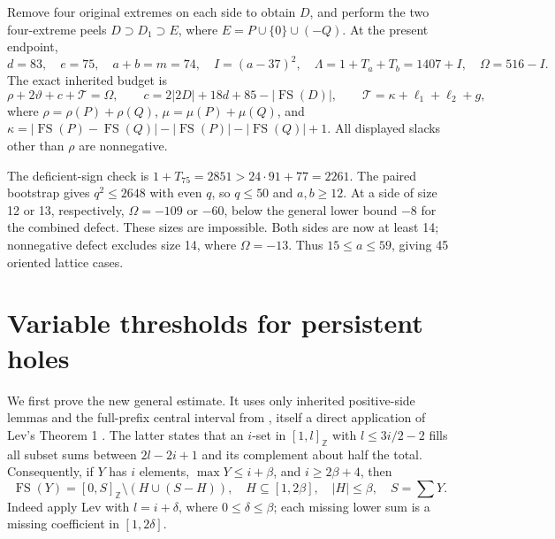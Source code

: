 \documentclass[11pt,a4paper]{article}
\newcommand{\FS}{\operatorname{FS}}
\newcommand{\Z}{\mathbb Z}
\newcommand{\T}{\mathcal T}
\begin{document}
Remove four original extremes on each side to obtain $D$, and perform
the two four-extreme peels $D\supset D_1\supset E$, where
$E=P\cup\{0\}\cup(-Q)$. At the present endpoint,
\[
 d=83,\quad e=75,\quad a+b=m=74,\quad I=(a-37)^2,
 \quad\Lambda=1+T_a+T_b=1407+I,\quad\Omega=516-I.
\]
The exact inherited budget is
\begin{equation}\label{budget}
 \rho+2\vartheta+c+\T=\Omega,\qquad
 c=2|2D|+18d+85-|\FS(D)|,\qquad
 \T=\kappa+\ell_1+\ell_2+g,
\end{equation}
where $\rho=\rho(P)+\rho(Q)$, $\mu=\mu(P)+\mu(Q)$, and
$\kappa=|\FS(P)-\FS(Q)|-|\FS(P)|-|\FS(Q)|+1$.
All displayed slacks other than $\rho$ are nonnegative.

The deficient-sign check is $1+T_{75}=2851>24\cdot91+77=2261$.
The paired bootstrap gives $q^2\le2648$ with even $q$, so $q\le50$
and $a,b\ge12$. At a side of size 12 or 13, respectively,
$\Omega=-109$ or $-60$, below the general lower bound $-8$ for the
combined defect. These sizes are impossible. Both sides are now at
least 14; nonnegative defect excludes size 14, where $\Omega=-13$.
Thus $15\le a\le59$, giving 45 oriented lattice cases.

\section{Variable thresholds for persistent holes}
We first prove the new general estimate. It uses only inherited
positive-side lemmas and the full-prefix central interval from
\cite{previous}, itself a direct application of Lev's Theorem 1
\cite{lev}. The latter states that an $i$-set in $[1,l]_{\Z}$ with
$l\le3i/2-2$ fills all subset sums between $2l-2i+1$ and its
complement about half the total. Consequently, if $Y$ has $i$ elements,
$\max Y\le i+\beta$, and $i\ge2\beta+4$, then
\begin{equation}\label{central}
 \FS(Y)=[0,S]_{\Z}\setminus(H\cup(S-H)),\quad
 H\subseteq[1,2\beta],\quad |H|\le\beta,\quad S=\sum Y.
\end{equation}
Indeed apply Lev with $l=i+\delta$, where $0\le\delta\le\beta$;
each missing lower sum is a missing coefficient in $[1,2\delta]$.
\end{document}
